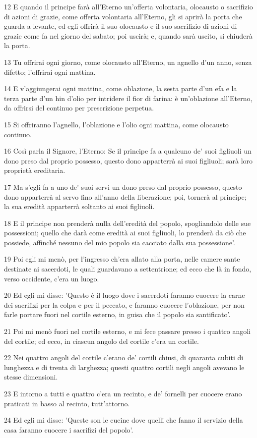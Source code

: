 \par 12 E quando il principe farà all'Eterno un'offerta volontaria, olocausto o sacrifizio di azioni di grazie, come offerta volontaria all'Eterno, gli si aprirà la porta che guarda a levante, ed egli offrirà il suo olocausto e il suo sacrifizio di azioni di grazie come fa nel giorno del sabato; poi uscirà; e, quando sarà uscito, si chiuderà la porta.
\par 13 Tu offrirai ogni giorno, come olocausto all'Eterno, un agnello d'un anno, senza difetto; l'offrirai ogni mattina.
\par 14 E v'aggiungerai ogni mattina, come oblazione, la sesta parte d'un efa e la terza parte d'un hin d'olio per intridere il fior di farina: è un'oblazione all'Eterno, da offrirsi del continuo per prescrizione perpetua.
\par 15 Si offriranno l'agnello, l'oblazione e l'olio ogni mattina, come olocausto continuo.
\par 16 Così parla il Signore, l'Eterno: Se il principe fa a qualcuno de' suoi figliuoli un dono preso dal proprio possesso, questo dono apparterrà ai suoi figliuoli; sarà loro proprietà ereditaria.
\par 17 Ma s'egli fa a uno de' suoi servi un dono preso dal proprio possesso, questo dono apparterrà al servo fino all'anno della liberazione; poi, tornerà al principe; la sua eredità apparterrà soltanto ai suoi figliuoli.
\par 18 E il principe non prenderà nulla dell'eredità del popolo, spogliandolo delle sue possessioni; quello che darà come eredità ai suoi figliuoli, lo prenderà da ciò che possiede, affinché nessuno del mio popolo sia cacciato dalla sua possessione'.
\par 19 Poi egli mi menò, per l'ingresso ch'era allato alla porta, nelle camere sante destinate ai sacerdoti, le quali guardavano a settentrione; ed ecco che là in fondo, verso occidente, c'era un luogo.
\par 20 Ed egli mi disse: 'Questo è il luogo dove i sacerdoti faranno cuocere la carne dei sacrifizi per la colpa e per il peccato, e faranno cuocere l'oblazione, per non farle portare fuori nel cortile esterno, in guisa che il popolo sia santificato'.
\par 21 Poi mi menò fuori nel cortile esterno, e mi fece passare presso i quattro angoli del cortile; ed ecco, in ciascun angolo del cortile c'era un cortile.
\par 22 Nei quattro angoli del cortile c'erano de' cortili chiusi, di quaranta cubiti di lunghezza e di trenta di larghezza; questi quattro cortili negli angoli avevano le stesse dimensioni.
\par 23 E intorno a tutti e quattro c'era un recinto, e de' fornelli per cuocere erano praticati in basso al recinto, tutt'attorno.
\par 24 Ed egli mi disse: 'Queste son le cucine dove quelli che fanno il servizio della casa faranno cuocere i sacrifizi del popolo'.

